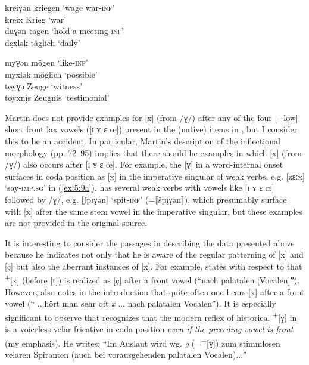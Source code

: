 \ex\label{ex:5:9e}
kreiɣən  \tab  kriegen \tab ‘wage war\textsc{{}-inf}’ \\
kreix   \tab [kreix]    \tab  Krieg   \tab ‘war’                     \\

\ex\label{ex:5:9f}
dɑ̄ɣən       \tab tagen   \tab ‘hold a meeting-\textsc{inf}’ \\
d\={ę}xlǝk  \tab täglich \tab ‘daily’ 


\ex\label{ex:5:9g}
myɣən  \tab [my.ɣən]  \tab mögen    \tab ‘like-\textsc{inf}’ \\
myxlək  \tab  möglich \tab ‘possible’          \\

\ex\label{ex:5:9h}
tøyɣə       \tab [tøy.ɣə]   \tab Zeuge   \tab ‘witness’     \\
tøyxn\k{i}s  \tab Zeugnis \tab ‘testimonial’ \\
      \z
\z 

Martin does not provide examples for [x] (from /ɣ/) after any of the four [−low] short  front lax vowels ([ɪ ʏ ɛ œ]) present in the (native) items in , but I consider this to be an accident. In particular, Martin’s description of the inflectional morphology (pp. 72--95)  implies that there should be examples in which [x] (from /ɣ/) also occurs after [ɪ ʏ ɛ œ]. For example, the [ɣ] in a word-internal onset surfaces in coda position as [x] in the imperative singular of weak verbs, e.g. [zɛːx] ‘say-\textsc{imp}.\textsc{sg}’ in (\ref{ex:5:9a}).  has several weak verbs with vowels like [ɪ ʏ ɛ œ] followed by /ɣ/, e.g. [ʃpɪɣən] ‘spit-\textsc{inf}’ (=⟦šp\k{i}ɣən⟧), which presumably surface with [x] after the same stem vowel in the imperative singular, but these examples are not provided in the original source.

It is interesting to consider the passages in \citet{Martin1925} describing the data presented above because  he indicates not only that he is aware of the regular patterning of [x] and [ç] but also the aberrant instances of [x]. For example, \citet[63]{Martin1925} states with respect to  that  \textsuperscript{+}[x] (before [t]) is realized as [ç] after a front vowel (“nach palatalen [Vocalen]ˮ). However, \citet[14]{Martin1925} also notes in the introduction that quite often one hears [x] after a front vowel (“ ...hört man sehr oft \textit{x} ... nach palatalen Vocalenˮ). It is especially significant to observe that \citet[52]{Martin1925} recognizes that the modern reflex of historical \textsuperscript{+}[ɣ] in  is a voiceless velar fricative in coda position \textit{even if the preceding vowel is front} (my emphasis). He writes: “Im Auslaut wird wg. \textit{g} (=\textsuperscript{+}[ɣ]) zum stimmlosen velaren Spiranten (auch bei vorausgehenden palatalen Vocalen)...ˮ

